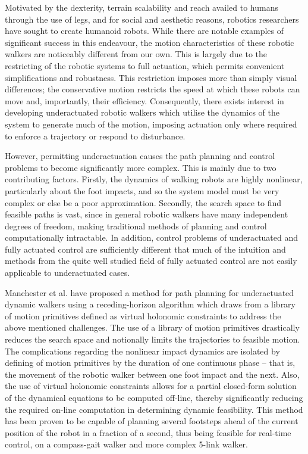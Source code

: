 Motivated by the dexterity, terrain scalability and reach availed to humans through the use of legs, and for social and aesthetic reasons, robotics researchers have sought to create humanoid robots. While there are notable examples of significant success in this endeavour, the motion characteristics of these robotic walkers are noticeably different from our own. This is largely due to the restricting of the robotic systems to full actuation, which permits convenient simplifications and robustness. This restriction imposes more than simply visual differences; the conservative motion restricts the speed at which these robots can move and, importantly, their efficiency. Consequently, there exists interest in developing underactuated robotic walkers which utilise the dynamics of the system to generate much of the motion, imposing actuation only where required to enforce a trajectory or respond to disturbance.

However, permitting underactuation causes the path planning and control problems to become significantly more complex. This is mainly due to two contributing factors. Firstly, the dynamics of walking robots are highly nonlinear, particularly about the foot impacts, and so the system model must be very complex or else be a poor approximation. Secondly, the search space to find feasible paths is vast, since in general robotic walkers have many independent degrees of freedom, making traditional methods of planning and control computationally intractable. In addition, control problems of underactuated and fully actuated control are sufficiently different that much of the intuition and methods from the quite well studied field of fully actuated control are not easily applicable to underactuated cases.

Manchester et al. \cite{manchester13planning} have proposed a method for path planning for underactuated dynamic walkers using a receding-horizon algorithm which draws from a library of motion primitives defined as virtual holonomic constraints to address the above mentioned challenges. The use of a library of motion primitives drastically reduces the search space and notionally limits the trajectories to feasible motion. The complications regarding the nonlinear impact dynamics are isolated by defining of motion primitives by the duration of one continuous phase – that is, the movement of the robotic walker between one foot impact and the next. Also, the use of virtual holonomic constraints allows for a partial closed-form solution of the dynamical equations to be computed off-line, thereby significantly reducing the required on-line computation in determining dynamic feasibility. This method has been proven to be capable of planning several footsteps ahead of the current position of the robot in a fraction of a second, thus being feasible for real-time control, on a compass-gait walker and more complex 5-link walker.

